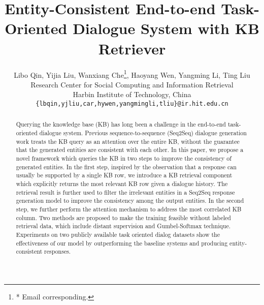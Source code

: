 \documentclass[11pt,a4paper]{article}
\title{Entity-Consistent End-to-end Task-Oriented Dialogue System with KB Retriever}
\author{Libo Qin, Yijia Liu, Wanxiang Che\thanks{* Email corresponding.},   Haoyang Wen, Yangming Li, Ting Liu \\
	Research Center for Social Computing and Information Retrieval \\
	Harbin Institute of Technology, China \\
	{\tt \{lbqin,yjliu,car,hywen,yangmingli,tliu\}@ir.hit.edu.cn}	
}
\date{}
\begin{document}
\maketitle
\begin{abstract}
	Querying the knowledge base (KB)
	has long been a challenge in the 
	end-to-end task-oriented dialogue system.
	Previous sequence-to-sequence (Seq2Seq) dialogue generation work
	treats the KB query as an attention over the entire KB,
	without the guarantee that the generated entities
	are consistent with each other.
	In this paper, we propose a novel framework which queries the KB in two steps to improve the consistency of generated entities.
	In the first step, 	inspired by the observation
	that a response can usually be supported by a single KB row,
	we introduce a KB retrieval component
	which explicitly returns the most relevant KB row given a dialogue history.
	The retrieval result is further used to filter the irrelevant entities
	in a Seq2Seq response generation model
	to improve the consistency among the output entities.
	In the second step, we further perform the attention mechanism to address the most correlated KB column.
	Two methods are proposed to make the training feasible 
	without labeled retrieval data, which include distant supervision and Gumbel-Softmax technique.
	Experiments on 
	two publicly available task oriented dialog datasets show
	the effectiveness of our model
	by outperforming the baseline systems 
	and producing entity-consistent responses.
\end{abstract}
\end{document}
